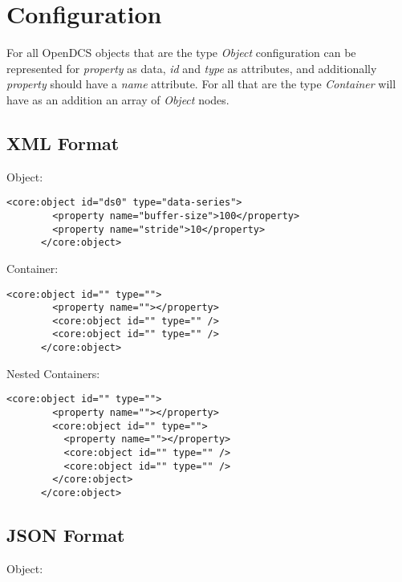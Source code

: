 \section{Configuration}\label{sec:cfg}

  For all OpenDCS objects that are the type \emph{Object} configuration can be
  represented for \emph{property} as data, \emph{id} and \emph{type} as
  attributes, and additionally \emph{property} should have a \emph{name}
  attribute. For all that are the type \emph{Container} will have as an
  addition an array of \emph{Object} nodes.

  \subsection{XML Format}\label{sec:cfg-xml}

    Object:

    \begin{lstlisting}[caption={Object Configuration in XML},label={lst:cfg-xml-obj}]
      <core:object id="ds0" type="data-series">
        <property name="buffer-size">100</property>
        <property name="stride">10</property>
      </core:object>
    \end{lstlisting}

    Container:

    \begin{lstlisting}[caption={Container Configuration in XML},label={lst:cfg-xml-ctr}]
      <core:object id="" type="">
        <property name=""></property>
        <core:object id="" type="" />
        <core:object id="" type="" />
      </core:object>
    \end{lstlisting}

    Nested Containers:

    \begin{lstlisting}[caption={Nested Container Configuration in XML},label={lst:cfg-xml-ctr}]
      <core:object id="" type="">
        <property name=""></property>
        <core:object id="" type="">
          <property name=""></property>
          <core:object id="" type="" />
          <core:object id="" type="" />
        </core:object>
      </core:object>
    \end{lstlisting}

  \subsection{JSON Format}\label{sec:cfg-json}

    Object:

